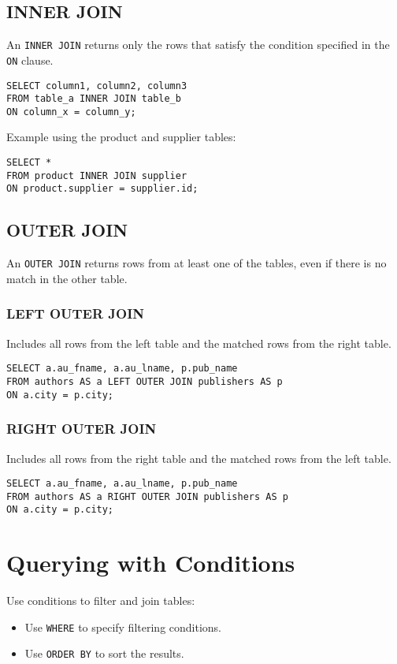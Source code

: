 \documentclass{article}
\begin{document}
\subsection{INNER JOIN}
An \texttt{INNER JOIN} returns only the rows that satisfy the condition specified in the \texttt{ON} clause.

\begin{verbatim}
SELECT column1, column2, column3
FROM table_a INNER JOIN table_b
ON column_x = column_y;
\end{verbatim}

Example using the product and supplier tables:
\begin{verbatim}
SELECT *
FROM product INNER JOIN supplier
ON product.supplier = supplier.id;
\end{verbatim}

\subsection{OUTER JOIN}
An \texttt{OUTER JOIN} returns rows from at least one of the tables, even if there is no match in the other table.

\subsubsection{LEFT OUTER JOIN}
Includes all rows from the left table and the matched rows from the right table.

\begin{verbatim}
SELECT a.au_fname, a.au_lname, p.pub_name
FROM authors AS a LEFT OUTER JOIN publishers AS p
ON a.city = p.city;
\end{verbatim}

\subsubsection{RIGHT OUTER JOIN}
Includes all rows from the right table and the matched rows from the left table.

\begin{verbatim}
SELECT a.au_fname, a.au_lname, p.pub_name
FROM authors AS a RIGHT OUTER JOIN publishers AS p
ON a.city = p.city;
\end{verbatim}

\section{Querying with Conditions}
Use conditions to filter and join tables:
\begin{itemize}
    \item Use \texttt{WHERE} to specify filtering conditions.
    \item Use \texttt{ORDER BY} to sort the results.
\end{itemize}
\end{document}
